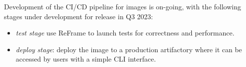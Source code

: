Development of the CI/CD pipeline for images is on-going, with the following stages under development for release in Q3 2023:
\begin{itemize}
    \item \emph{test stage} use ReFrame to launch tests for correctness and performance.
    \item \emph{deploy stage}: deploy the image to a production artifactory where it can be accessed by users with a simple CLI interface.
\end{itemize}

